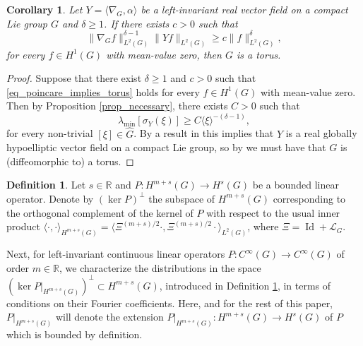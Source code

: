 \documentclass[11pt]{amsart}
\numberwithin{theorem}{section}
\numberwithin{equation}{section}
\newtheorem{corollary}[theorem]{Corollary}
\theoremstyle{definition}
\numberwithin{example}{section}
\theoremstyle{definition}
\theoremstyle{definition}
\newtheorem{definition}[theorem]{Definition}
\newcommand{\R}{\mathbb{R}}
\begin{document}
\begin{corollary}\label{coro_poincare_implies_torus}
Let $Y=\langle \nabla_{G},\alpha\rangle$ be a left-invariant real vector field on a compact Lie group $G$ and $\delta\geq 1$. If there exists $c>0$ such that 
    \begin{equation}\label{eq_poincare_implies_torus}
        \|\nabla_{G} f\|_{L^2(G)}^{\delta-1}\| Yf\|_{L^2(G)}\geq c\|f\|_{L^2(G)}^\delta,
    \end{equation}
    for every $f\in H^1(G)$ with mean-value zero, then $G$ is a torus.
\end{corollary}
\begin{proof}
Suppose that there exist $\delta\geq 1$ and $c>0$ such that \eqref{eq_poincare_implies_torus} holds for every $f\in H^1(G)$ with mean-value zero. Then by Proposition \ref{prop_necessary}, there exists $C>0$ such that
\begin{equation*}
    \lambda_{\min}[\sigma_{Y}(\xi)]\geq C\langle \xi\rangle^{-(\delta-1)},
\end{equation*}
for every non-trivial $[\xi]\in\widehat{G}$. By a result in \cite{strongly_invariant_KW,tese-Nicholas} this implies that $Y$ is a real globally hypoelliptic vector field on a compact Lie group, so by \cite{GW_GH_vector_fields} we must have that $G$ is (diffeomorphic to) a torus.
\end{proof}




\begin{definition}\label{def_EY}
     Let $s\in\R$ and $P:H^{m+s}(G)\to H^s(G)$ be a bounded linear operator. Denote by $ (\ker P)^\perp$ the subspace of $H^{m+s}(G)$ corresponding to the orthogonal complement of the kernel of $P$ with respect to the usual inner product $\langle \cdot ,\cdot \rangle _{H^{m+s}(G)}=\langle \Xi^{(m+s)/2}\cdot , \Xi^{(m+s)/2}\cdot\rangle_{L^2(G)}$, where $\Xi=\operatorname{Id}+\mathcal{L}_G$.
\end{definition}



Next, for left-invariant continuous linear operators $P:C^\infty(G)\to C^\infty(G)$ of order $m\in\R$, we characterize the distributions in the space $(\ker P|_{H^{m+s}(G)})^\perp\subset H^{m+s}(G)$, introduced in Definition \ref{def_EY}, in terms of conditions on their Fourier coefficients. Here, and for the rest of this paper, $P|_{H^{m+s}(G)}$ will denote the extension $P|_{H^{m+s}(G)}:H^{m+s}(G)\to H^s(G)$ of $P$ which is bounded by definition.
\end{document}
